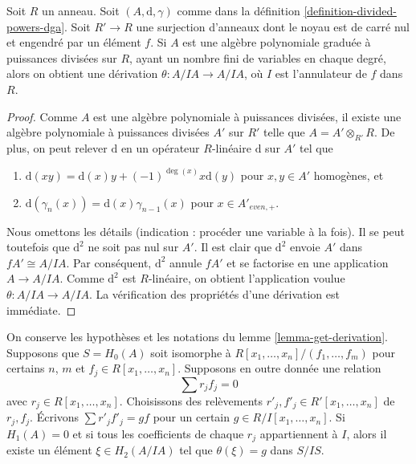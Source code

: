 \begin{lemma}
\label{lemma-get-derivation}
Soit $R$ un anneau. Soit $(A, \text{d}, \gamma)$ comme dans
la définition \ref{definition-divided-powers-dga}.
Soit $R' \to R$ une surjection d'anneaux dont le
noyau est de carré nul et engendré par un élément $f$.
Si $A$ est une algèbre polynomiale graduée à puissances divisées sur $R$,
ayant un nombre fini de variables en chaque degré,
alors on obtient une dérivation
$\theta : A/IA \to A/IA$, où $I$ est l'annulateur
de $f$ dans $R$.
\end{lemma}

\begin{proof}
Comme $A$ est une algèbre polynomiale à puissances divisées, il existe une algèbre
polynomiale à puissances divisées $A'$ sur $R'$ telle que $A = A' \otimes_{R'} R$.
De plus, on peut relever $\text{d}$ en un opérateur $R$-linéaire
$\text{d}$ sur $A'$ tel que
\begin{enumerate}
\item $\text{d}(xy) = \text{d}(x)y + (-1)^{\deg(x)}x \text{d}(y)$
pour $x, y \in A'$ homogènes, et
\item $\text{d}(\gamma_n(x)) = \text{d}(x) \gamma_{n - 1}(x)$ pour
$x \in A'_{even, +}$.
\end{enumerate}
Nous omettons les détails (indication : procéder une variable
à la fois). Il se peut toutefois que $\text{d}^2$
ne soit pas nul sur $A'$. Il est clair que $\text{d}^2$ envoie $A'$ dans
$fA' \cong A/IA$. Par conséquent, $\text{d}^2$ annule $fA'$ et se factorise en
une application $A \to A/IA$. Comme $\text{d}^2$ est $R$-linéaire, on obtient
l'application voulue $\theta : A/IA \to A/IA$. La vérification des propriétés
d'une dérivation est immédiate.
\end{proof}

\begin{lemma}
\label{lemma-compute-theta} On
conserve les hypothèses et les notations du lemme \ref{lemma-get-derivation}.
Supposons que $S = H_0(A)$ soit isomorphe à
$R[x_1, \ldots, x_n]/(f_1, \ldots, f_m)$
pour certains $n$, $m$ et $f_j \in R[x_1, \ldots, x_n]$.
Supposons en outre donnée une relation
$$
\sum r_j f_j = 0
$$
avec $r_j \in R[x_1, \ldots, x_n]$.
Choisissons des relèvements $r'_j, f'_j \in R'[x_1, \ldots, x_n]$ de $r_j, f_j$.
Écrivons $\sum r'_j f'_j = gf$ pour un certain $g \in R/I[x_1, \ldots, x_n]$.
Si $H_1(A) = 0$ et si tous les coefficients de chaque $r_j$ appartiennent à $I$,
alors il existe un élément $\xi\in H_2(A/IA)$ tel que
$\theta(\xi) = g$ dans $S/IS$.
\end{lemma}

